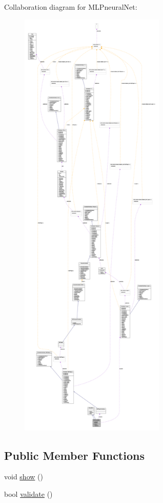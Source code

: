 Collaboration diagram for MLPneuralNet:
\nopagebreak
\begin{figure}[H]
\begin{center}
\leavevmode
\includegraphics[height=600pt]{class_m_l_pneural_net__coll__graph}
\end{center}
\end{figure}
\subsection*{Public Member Functions}
\begin{DoxyCompactItemize}
\item 
void \hyperlink{class_m_l_pneural_net_ae92624bfac84bda339013a27db8308af}{show} ()
\item 
bool \hyperlink{class_m_l_pneural_net_ae0aae6e9c474eef1cfb1fdff98bf1360}{validate} ()
\end{DoxyCompactItemize}
